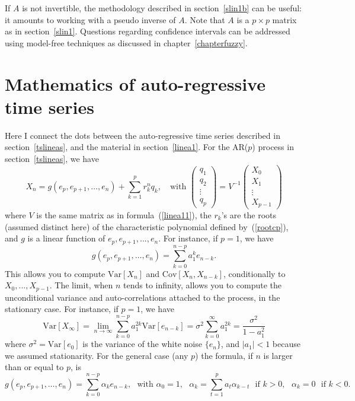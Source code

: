 \documentclass[oneside,10pt]{book}
\begin{document}
If $A$ is not invertible, the methodology described in section~\ref{slin1b} can be useful: it amounts to working with a pseudo inverse of $A$. Note that $A$ is a $p \times p$ matrix as in section~\ref{slin1}. Questions regarding confidence intervals can be addressed using model-free techniques as discussed in chapter~\ref{chapterfuzzy}.

\section{Mathematics of auto-regressive time series}\label{linearar}

Here I connect the dots between the auto-regressive \textcolor{index}{time series} described in section~\ref{tslineas}, and the material in section~\ref{linea1}. For the AR($p$) process in section~\ref{tslineas}, we have
$$
X_n = g(e_p,e_{p+1},\dots,e_n)+\sum_{k=1}^p r_k^n q_k, \quad \text{with }
\left(
\begin{array}{c}
q_1 \\
q_2 \\
\vdots \\
q_p
\end{array}
\right)
=V^{-1}
\left(
\begin{array}{c}
X_0 \\
X_1 \\
\vdots \\
X_{p-1}
\end{array}
\right)
$$
where $V$ is the same matrix as in formula~(\ref{linea11}), the $r_k$'s are the roots (assumed distinct here) of the
\textcolor{index}{characteristic polynomial} defined by~(\ref{rootcp}), and $g$ is a linear function of $e_p, e_{p+1}, ..., e_n$. For instance, if $p = 1$, we have
$$
g(e_p,e_{p+1},\dots,e_n)=\sum_{k=0}^{n-p}a_1^k e_{n-k}.
$$
This allows you to compute $\text{Var}[X_n]$ and $\text{Cov}[X_n, X_{n-k}]$, conditionally to  $X_0, ..., X_{p-1}$. The limit, when $n$ tends to infinity, allows you to compute the unconditional variance and auto-correlations attached to the process, in the stationary case. For instance, if $p = 1$, we have
$$
\text{Var}[X_\infty]=\lim_{n\rightarrow\infty}\sum_{k=0}^{n-p} a_1^{2k} \text{Var}[e_{n-k}] =\sigma^2\sum_{k=0}^\infty a_1^{2k}=\frac{\sigma^2}{1-a_1^2}
$$
where $\sigma^2=\text{Var}[e_0]$ is the variance of the white noise $\{e_n\}$, and $|a_1| < 1$ because we assumed stationarity.  For the general case (any $p$) the formula, if $n$ is larger than or equal to $p$, is
$$
g(e_p,e_{p+1},\dots,e_n)=\sum_{k=0}^{n-p}\alpha_k e_{n-k},  \text{ } \text{with }\alpha_0 =1,  \text{ } \alpha_k=\sum_{t=1}^p a_t \alpha_{k-t} \text{ }  \text{if } k>0, \text{ } \alpha_k=0 \text{ } \text{if } k<0.
$$
\end{document}
